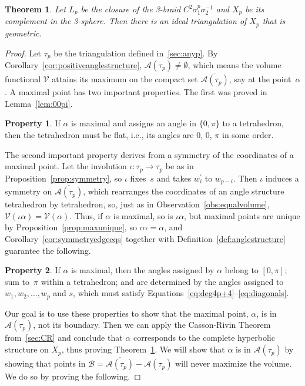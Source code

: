 \documentclass[reqno]{amsart}
\theoremstyle{plain}
\newtheorem{thm}{Theorem}[section]
\theoremstyle{definition}
\newtheorem{property}{Property}
\begin{document}
\begin{thm}\label{thm:q=1}
Let $L_p$ be the closure of the 3-braid $C^2\sigma_1^p\sigma_2^{-1}$ and $X_{p}$ be its complement in the 3-sphere.  Then there is an ideal triangulation of $X_{p}$ that is geometric.
\end{thm}

\begin{proof}

Let $\tau_{p}$ be the triangulation defined in~\ref{sec:anyp}. By  Corollary~\ref{cor:positiveanglestructure}, $\mathcal{A}(\tau_{p})\ne\emptyset$, which means the volume functional $\mathcal{V}$ attains its maximum on the compact set $\overline{\mathcal{A}(\tau_{p})}$, say at the point~$\alpha$.  A maximal point has two important properties.  The first was proved in Lemma~\ref{lem:00pi}.

\begin{property}\label{property:1}
If $\alpha$ is maximal and assigns an angle in $\{0,\pi\}$ to a tetrahedron, then the tetrahedron must be flat, i.e., its angles are $0$, $0$, $\pi$ in some order.  
\end{property}

The second important property derives from a symmetry of the coordinates of a maximal point.  Let the involution $\iota:\tau_{p}\rightarrow\tau_{p}$ be as in Proposition~\ref{prop:symmetry}, so $\iota$ fixes~$s$ and takes $w_i^\prime$ to $w_{p-i}$.  Then $\iota$ induces a symmetry on $\overline{\mathcal{A}(\tau_{p})}$, which rearranges the coordinates of an angle structure tetrahedron by tetrahedron, so, just as in Observation~\ref{obs:equalvolume}, $\mathcal{V}(\iota\alpha)=\mathcal{V}(\alpha)$.  Thus, if $\alpha$ is maximal, so is $\iota\alpha$, but  maximal points are unique by Proposition~\ref{prop:maxunique}, so $\iota\alpha=\alpha$, and  Corollary~\ref{cor:symmetryedgeeqs} together with Definition~\ref{def:anglestructure} guarantee the following.

\begin{property}\label{property:2}
If $\alpha$ is maximal, then the angles assigned by $\alpha$ belong to $[0,\pi]$; sum to~$\pi$ within a tetrahedron; and are determined by the angles assigned to $w_1, w_2, \dots, w_p$ and $s$, which must satisfy Equations~\eqref{eq:deg4p+4}--\eqref{eq:diagonals}.
\end{property}

Our goal is to use these properties to show that the maximal point, $\alpha$, is in~$\mathcal{A}(\tau_{p})$, not its boundary.  Then we can apply the Casson-Rivin Theorem from~\ref{sec:CR} \cite[Theorem 1.2]{AngledtoHyperbolic} and conclude that $\alpha$ corresponds to the complete hyperbolic structure on $X_{p}$, thus proving Theorem~\ref{thm:q=1}.  We will show that $\alpha$ is in $\mathcal{A}(\tau_{p})$ by showing that points in $\mathcal{B}=\overline{\mathcal{A}(\tau_{p})}-\mathcal{A}(\tau_{p})$ will never maximize the volume.  We do so by proving the following.


\end{proof}
\end{document}
